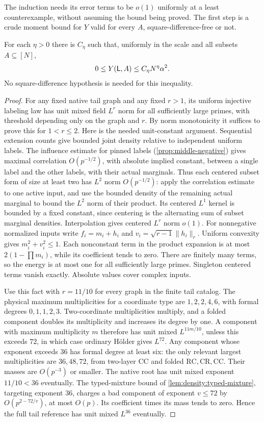 The induction needs its error terms to be $o(1)$ uniformly at a
least counterexample, without assuming the bound being proved.
The first step is a crude moment bound for $Y$ valid for every
$A$, square-difference-free or not.

\begin{lemma}\label{lem:density:global-moment}
For each $\eta>0$ there is $C_\eta$ such that, uniformly in the scale
and all subsets $A\subseteq[N]$,
\[
 0\le Y(\mathsf L,A)\le C_\eta N^\eta\alpha^2.
\]
No square-difference hypothesis is needed for this inequality.
\end{lemma}

\begin{proof}
For any fixed native tail graph and any fixed $r>1$, its uniform
injective labeling law has unit mixed field $L^r$ norm for all sufficiently large primes, with threshold depending only on the graph and $r$. By norm monotonicity it suffices to prove this for
$1<r\le2$. Here is the needed unit-constant argument. Sequential
extension counts give bounded joint density relative to independent
uniform labels. The influence estimate for pinned labels
(\cref{prop:middle-negative}) gives maximal correlation
$O(p^{-1/2})$, with absolute implied constant, between a single
label and the other labels, with their actual marginals. Thus each centered subset form of size at least two
has $L^2$ norm $O(p^{-1/2})$: apply the correlation estimate to one
active input, and use the bounded density of the remaining actual
marginal to bound the $L^2$ norm of their product. Its centered $L^1$ kernel is bounded by
a fixed constant, since centering is the alternating sum of subset
marginal densities. Interpolation gives centered $L^r$ norm $o(1)$.
For nonnegative normalized inputs write $f_i=m_i+h_i$ and
$v_i=\sqrt{r-1}\|h_i\|_r$. Uniform convexity gives
$m_i^2+v_i^2\le1$. Each nonconstant term in the product expansion is
at most $2(1-\prod m_i)$, while its coefficient tends to zero.
There are finitely many terms, so the energy is at most one for all
sufficiently large primes. Singleton centered terms vanish exactly.
Absolute values cover complex inputs.

Use this fact with $r=11/10$ for every graph in the finite tail catalog.
The physical maximum multiplicities for a coordinate type are
$1,2,2,4,6$, with formal degrees $0,1,1,2,3$.
Two-coordinate multiplicities multiply, and a folded component doubles
its multiplicity and increases its degree by one. A component with
maximum multiplicity $m$ therefore has unit mixed $L^{11m/10}$,
unless this exceeds $72$, in which case ordinary H\"older gives $L^{72}$.
Any component whose exponent exceeds $36$ has formal degree at least six:
the only relevant largest multiplicities are $36,48,72$, from two-layer
$\mathrm{CC}$ and folded $\mathrm{RC},\mathrm{CR},\mathrm{CC}$.
Their masses are $O(p^{-3})$ or smaller. The native root has unit
mixed exponent $11/10<36$ eventually. The typed-mixture bound of
\cref{lem:density:typed-mixture}, targeting exponent $36$, charges a bad component of exponent $v\le72$ by $O(p^{2-72/v})$, at most $O(p)$.
Its coefficient times its mass tends to zero. Hence the full tail
reference has unit mixed $L^{36}$ eventually.


\end{proof}
